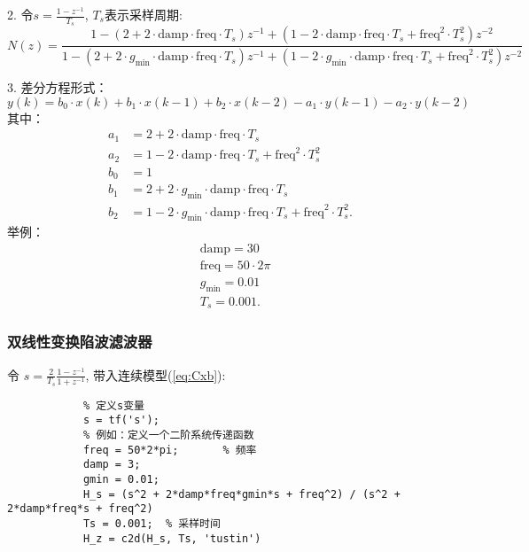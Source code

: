             2. 令$s = \frac{1-z^{-1}}{T_s}$, $T_s$表示采样周期: 
                \begin{equation}
                    N(z) = \frac{1 - \left(2 + 2 \cdot \text{damp} \cdot \text{freq} \cdot T_s\right)z^{-1} + \left(1 - 2 \cdot \text{damp} \cdot \text{freq} \cdot T_s + \text{freq}^2 \cdot T_s^2\right)z^{-2}}{1 - \left(2 + 2 \cdot g_{\text{min}} \cdot \text{damp} \cdot \text{freq} \cdot T_s\right)z^{-1} + \left(1 - 2 \cdot g_{\text{min}} \cdot \text{damp} \cdot \text{freq} \cdot T_s + \text{freq}^2 \cdot T_s^2\right)z^{-2}}
                \end{equation}

            3. 差分方程形式：
            \begin{equation}
                y(k) = b_0 \cdot x(k) + b_1 \cdot x(k-1) + b_2 \cdot x(k-2) - a_1 \cdot y(k-1) - a_2 \cdot y(k-2)
            \end{equation}
            其中：
                \begin{equation}
                    \begin{aligned}
                        a_1 &= 2 + 2 \cdot \text{damp} \cdot \text{freq} \cdot T_s \\
                        a_2 &= 1 - 2 \cdot \text{damp} \cdot \text{freq} \cdot T_s + \text{freq}^2 \cdot T_s^2 \\
                        b_0 &= 1 \\
                        b_1 &= 2 + 2 \cdot g_{\text{min}} \cdot \text{damp} \cdot \text{freq} \cdot T_s \\
                        b_2 &= 1 - 2 \cdot g_{\text{min}} \cdot \text{damp} \cdot \text{freq} \cdot T_s + \text{freq}^2 \cdot T_s^2.
                        \end{aligned}
                \end{equation}
            举例：
            \begin{equation}
                \begin{aligned}
                    &\text{damp} = 30 \\
                    &\text{freq} = 50 \cdot  2\pi \\
                    &g_{\text{min}} =  0.01\\
                    &T_s = 0.001.
                    \end{aligned}
            \end{equation}
        
        \subsubsection*{双线性变换陷波滤波器}
            令 $s = \frac{2}{T_s}\frac{1-z^{-1}}{1+z^{-1}}$, 带入连续模型(\ref{eq:Cxb}):
        \begin{lstlisting}
            % 定义s变量
            s = tf('s');
            % 例如：定义一个二阶系统传递函数
            freq = 50*2*pi;       % 频率
            damp = 3;             
            gmin = 0.01;
            H_s = (s^2 + 2*damp*freq*gmin*s + freq^2) / (s^2 + 2*damp*freq*s + freq^2)
            Ts = 0.001;  % 采样时间
            H_z = c2d(H_s, Ts, 'tustin')
        \end{lstlisting}
        


